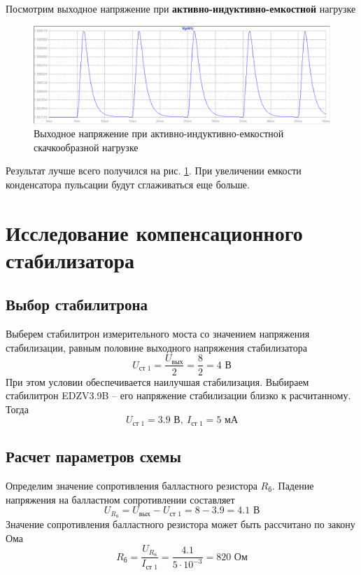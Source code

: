 \documentclass[a4paper, 12pt]{article}
\begin{document}
    \noindent Посмотрим выходное напряжение при \textbf{активно-индуктивно-емкостной} нагрузке
    \begin{figure}[H]
        \centering
        \includegraphics[scale=0.46]{2task_rect_ALC.png}
        \captionsetup{skip=0pt}
        \caption{Выходное напряжение при активно-индуктивно-емкостной скачкообразной нагрузке}
        \label{fig:2task_rect_ALC}
    \end{figure}
    \noindent Результат лучше всего получился на рис. \ref{fig:2task_rect_ALC}.
    При увеличении емкости конденсатора пульсации будут сглаживаться еще больше.


    \section{Исследование компенсационного стабилизатора}
    \subsection{Выбор стабилитрона}
    Выберем стабилитрон измерительного моста со значением напряжения
    стабилизации, равным половине выходного напряжения стабилизатора
    $$
    U_{\text{ст 1}}=\dfrac{U_{\text{вых}}}{2}=\dfrac{8}{2}=4\text{ В}
    $$
    При этом условии обеспечивается наилучшая стабилизация.
    Выбираем стабилитрон EDZV3.9B -- его напряжение стабилизации
    близко к расчитанному. Тогда
    $$
    U_{\text{ст 1}}=3.9\text{ В},\ I_{\text{ст 1}}=5\text{ мА}
    $$


    \subsection{Расчет параметров схемы}
    Определим значение сопротивления балластного резистора
    $R_{\text{б}}$. Падение напряжения на балластном сопротивлении
    составляет
    $$
    U_{R_\text{б}}=U_{\text{вых}}-U_{\text{ст 1}}=8-3.9=4.1\text{ В}
    $$
    Значение сопротивления балластного резистора может быть рассчитано по закону Ома
    $$
    R_{\text{б}}=\dfrac{U_{R_\text{б}}}{I_{\text{ст 1}}}=\dfrac{4.1}{5\cdot10^{-3}}=820\text{ Ом}
    $$
\end{document}
